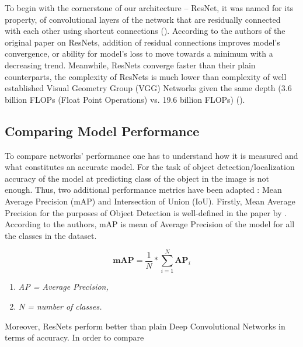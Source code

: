 \documentclass{article}
\begin{document}
To begin with the cornerstone of our architecture -- ResNet, it was named for its property,
of convolutional layers of the network that are residually connected with each other using
shortcut connections ().
According to the authors of the original paper on ResNets,
addition of residual connections improves model's convergence, or ability for
model's loss to move towards a minimum with a decreasing trend. Meanwhile,
ResNets converge faster than their plain counterparts, the complexity of 
ResNets is much lower than complexity of well established Visual Geometry
Group (VGG) Networks given the same depth (3.6 billion FLOPs (Float Point 
Operations) vs. 19.6 billion FLOPs) (). 

\subsection{Comparing Model Performance}
To compare networks' performance one has to understand how it is measured and what
constitutes an accurate model. For the task of object detection/localization accuracy
of the model at predicting class of the object in the image is not enough. Thus,
two additional performance metrics have been adapted : Mean Average Precision (mAP) and
Intersection of Union (IoU). Firstly, Mean Average Precision for the purposes of Object
Detection is well-defined in the paper by . According to the authors,
mAP is mean of Average Precision of the model for all the classes in the dataset.


\begin{equation}
	\textbf{mAP} = \frac{1}{N} * \sum_{i = 1}^{N} \textbf{AP}_i
\end{equation}

\begingroup
\fontsize{7pt}{9pt}\selectfont
\begin{enumerate}
	\item[]  \begin{center} \textit{AP = Average Precision,} \end{center}
	\item[] \begin{center}  \textit{N = number of classes.} \end{center}
\end{enumerate}
\endgroup

Moreover, ResNets perform better
than plain Deep Convolutional Networks in terms of accuracy. In order to compare 

\newpage


\end{document}
